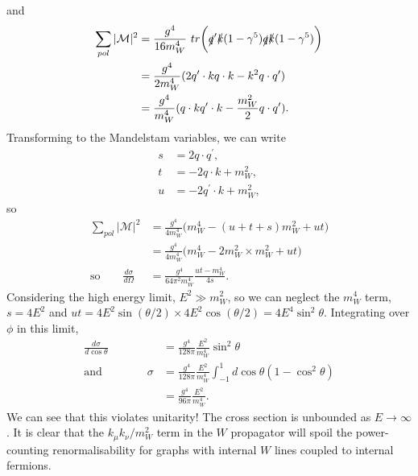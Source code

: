 and
\begin{equation}
\begin{split}
    \sum_{pol}|\mathcal{M}|^2 &= \frac{g^4}{16 m_W^4}\ tr\bigg(\slashed{q}^\prime \slashed{k}(1-\gamma^5)\slashed{q}\slashed{k}(1-\gamma^5)\bigg) \\
    & = \frac{g^4}{2m_W^4}(2q^\prime \cdot k q \cdot k - k^2 q \cdot q^\prime) \\
    & = \frac{g^4}{m_W^4} (q \cdot k q^\prime \cdot k - \frac{m_W^2}{2}q \cdot q^\prime).
\end{split}
\end{equation} 
Transforming to the Mandelstam variables, we can write
\begin{equation}
\begin{split}
s &= 2 q \cdot q^\prime, \\
t &= - 2 q \cdot k + m_W^2, \\
u &= - 2 q^\prime \cdot k + m_W^2,
\end{split}
\end{equation}
so
\begin{equation}
\begin{split}
    \sum_{pol}|\mathcal{M}|^2 &= \frac{g^4}{4m_W^4} \big(m_W^4 - (u + t + s)m_W^2 + ut\big)\\
    &= \frac{g^4}{4m_W^4} \big(m_W^4 - 2m_W^2 \times m_W^2 + ut\big)\\
 \text{so} \qquad   \frac{d\sigma}{d\Omega} &= \frac{g^4}{64\pi^2m_W^4}\frac{ut-m_W^4}{4s}.
\end{split}
\end{equation}
Considering the high energy limit, $E^2 \gg m_W^2$, so we can neglect the $m_W^4$ term, $s=4E^2$ and $ut = 4E^2\sin(\theta/2)\times 4E^2\cos(\theta/2) = 4E^4\sin^2\theta$. Integrating over $\phi$ in this limit,
\begin{equation}
\begin{split}
\frac{d\sigma}{d\cos\theta} &= \frac{g^4}{128\pi}\frac{E^2}{m_W^4}\sin^2\theta \\
\text{and} \qquad \qquad \sigma &= \frac{g^4}{128\pi}\frac{E^2}{m_W^4} \int_{-1}^1 d\cos\theta (1-\cos^2\theta) \\
&= \frac{g^4}{96\pi}\frac{E^2}{m_W^4}. 
\end{split}
\end{equation}
We can see that this violates unitarity! The cross section is unbounded as $E \to \infty$. It is clear that the $k_\mu k_\nu/m_W^2$ term in the $W$ propagator will spoil the power-counting renormalisability for graphs with internal $W$ lines coupled to internal fermions. 
